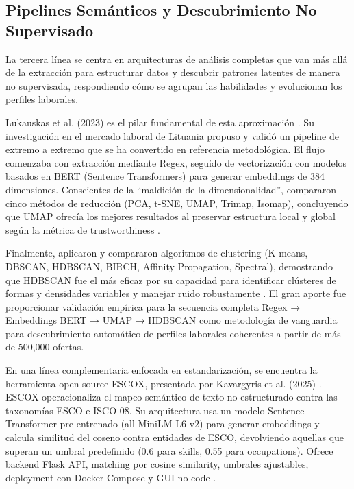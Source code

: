 \subsection{Pipelines Semánticos y Descubrimiento No Supervisado}

La tercera línea se centra en arquitecturas de análisis completas que van más allá de la extracción para estructurar datos y descubrir patrones latentes de manera no supervisada, respondiendo cómo se agrupan las habilidades y evolucionan los perfiles laborales.

Lukauskas et al. (2023) es el pilar fundamental de esta aproximación \cite{lukauskas2023}. Su investigación en el mercado laboral de Lituania propuso y validó un pipeline de extremo a extremo que se ha convertido en referencia metodológica. El flujo comenzaba con extracción mediante Regex, seguido de vectorización con modelos basados en BERT (Sentence Transformers) para generar embeddings de 384 dimensiones. Conscientes de la ``maldición de la dimensionalidad'', compararon cinco métodos de reducción (PCA, t-SNE, UMAP, Trimap, Isomap), concluyendo que UMAP ofrecía los mejores resultados al preservar estructura local y global según la métrica de trustworthiness \cite{lukauskas2023}.

Finalmente, aplicaron y compararon algoritmos de clustering (K-means, DBSCAN, HDBSCAN, BIRCH, Affinity Propagation, Spectral), demostrando que HDBSCAN fue el más eficaz por su capacidad para identificar clústeres de formas y densidades variables y manejar ruido robustamente \cite{lukauskas2023}. El gran aporte fue proporcionar validación empírica para la secuencia completa Regex → Embeddings BERT → UMAP → HDBSCAN como metodología de vanguardia para descubrimiento automático de perfiles laborales coherentes a partir de más de 500,000 ofertas.

En una línea complementaria enfocada en estandarización, se encuentra la herramienta open-source ESCOX, presentada por Kavargyris et al. (2025) \cite{kavargyris2025}. ESCOX operacionaliza el mapeo semántico de texto no estructurado contra las taxonomías ESCO e ISCO-08. Su arquitectura usa un modelo Sentence Transformer pre-entrenado (all-MiniLM-L6-v2) para generar embeddings y calcula similitud del coseno contra entidades de ESCO, devolviendo aquellas que superan un umbral predefinido (0.6 para skills, 0.55 para occupations). Ofrece backend Flask API, matching por cosine similarity, umbrales ajustables, deployment con Docker Compose y GUI no-code \cite{kavargyris2025}.

